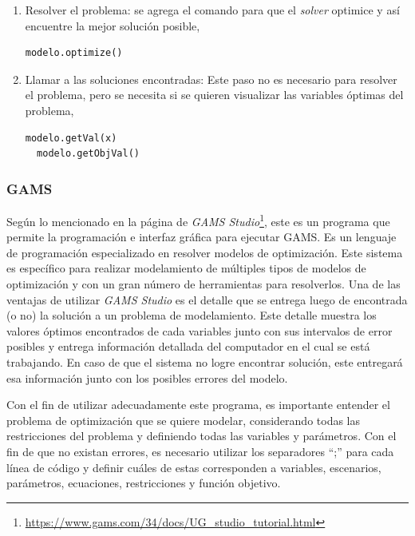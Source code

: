 \begin{enumerate}
  
  \item  Resolver el problema: se agrega el comando para que el \textit{solver} optimice y así encuentre la mejor solución posible,
  
  \begin{footnotesize}
  \begin{lstlisting}[language=Python]
  modelo.optimize()
  \end{lstlisting}
  \end{footnotesize}
  
  \item  Llamar a las soluciones encontradas: Este paso no es necesario para resolver el problema, pero se necesita si se quieren visualizar las variables óptimas del problema,
  
  \begin{footnotesize}
  \begin{lstlisting}[language=Python]
  modelo.getVal(x)
  modelo.getObjVal()
  \end{lstlisting}
  \end{footnotesize}
  
\end{enumerate}

\subsubsection{GAMS}

Según lo mencionado en la página de \textit{GAMS Studio}\footnote{\url{https://www.gams.com/34/docs/UG_studio_tutorial.html}}, este es un programa que permite la programación e interfaz gráfica para ejecutar GAMS. Es un lenguaje de programación especializado en resolver modelos de optimización. Este sistema es específico para realizar modelamiento de múltiples tipos de modelos de optimización y con un gran número de herramientas para resolverlos. Una de las ventajas de utilizar \emph{GAMS Studio} es el detalle que se entrega luego de encontrada (o no) la solución a un problema de modelamiento. Este detalle muestra los valores óptimos encontrados de cada variables junto con sus intervalos de error posibles y entrega información detallada del computador en el cual se está trabajando. En caso de que el sistema no logre encontrar solución, este entregará esa información junto con los posibles errores del modelo. 
\vspace{2.5mm}

Con el fin de utilizar adecuadamente este programa, es importante entender el problema de optimización que se quiere modelar, considerando todas las restricciones del problema y definiendo todas las variables y parámetros. Con el fin de que no existan errores, es necesario utilizar los separadores “;” para cada línea de código y definir cuáles de estas corresponden a variables, escenarios, parámetros, ecuaciones, restricciones y función objetivo. 
\vspace{2.5mm}

